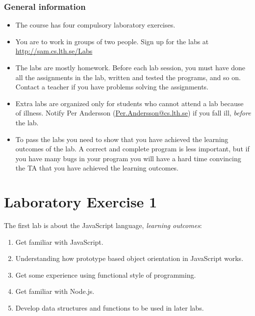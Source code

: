 \documentclass[fleqn, article, a4paper]{memoir}
\begin{document}
\maketitle
\thispagestyle{titlepage}
\vspace{-4cm}

\subsubsection*{General information}

\begin{itemize}\firmlist
\item The course has four compulsory laboratory exercises. 
\item You are to work in groups of two people. Sign up for the labs at\\ \url{http://sam.cs.lth.se/Labs}
\item The labs are mostly homework. Before each lab session, you must have done all the assign\-ments in the lab, written and tested the programs, and so on. Contact a teacher if you have problems solving the assignments. 
\item Extra labs are organized only for students who cannot attend a lab because of illness. Notify Per Andersson (\url{Per.Andersson@cs.lth.se}) if you fall ill, \emph{before} the lab.
\item To pass the labs you need to show that you have achieved the learning outcomes of the lab. A correct and complete program is less important, but if you have many bugs in your program you will have a hard time convincing the TA that you have achieved the learning outcomes.
\end{itemize}

\section*{Laboratory Exercise 1}
\n The first lab is about the JavaScript language, \emph{learning outcomes}:
\begin{enumerate}\firmlist 
\item Get familiar with JavaScript.
\item Understanding how prototype based object orientation in JavaScript works.
\item Get some experience using functional style of programming.
\item Get familiar with Node.js.
\item Develop data structures and functions to be used in later labs.
\end{enumerate}
\end{document}

